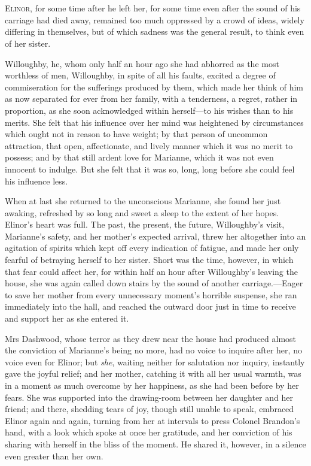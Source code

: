 \chapter[Chapter \thechapter]{}
\lettrine[lraise=0.3]{E}{linor}, for some time after he left her, for some time even after the sound of his carriage had died away, remained too much oppressed by a crowd of ideas, widely differing in themselves, but of which sadness was the general result, to think even of her sister.

Willoughby, he, whom only half an hour ago she had abhorred as the most worthless of men, Willoughby, in spite of all his faults, excited a degree of commiseration for the sufferings produced by them, which made her think of him as now separated for ever from her family, with a tenderness, a regret, rather in proportion, as she soon acknowledged within herself—to his wishes than to his merits. She felt that his influence over her mind was heightened by circumstances which ought not in reason to have weight; by that person of uncommon attraction, that open, affectionate, and lively manner which it was no merit to possess; and by that still ardent love for Marianne, which it was not even innocent to indulge. But she felt that it was so, long, long before she could feel his influence less.

When at last she returned to the unconscious Marianne, she found her just awaking, refreshed by so long and sweet a sleep to the extent of her hopes. Elinor's heart was full. The past, the present, the future, Willoughby's visit, Marianne's safety, and her mother's expected arrival, threw her altogether into an agitation of spirits which kept off every indication of fatigue, and made her only fearful of betraying herself to her sister. Short was the time, however, in which that fear could affect her, for within half an hour after Willoughby's leaving the house, she was again called down stairs by the sound of another carriage.—Eager to save her mother from every unnecessary moment's horrible suspense, she ran immediately into the hall, and reached the outward door just in time to receive and support her as she entered it.

Mrs Dashwood, whose terror as they drew near the house had produced almost the conviction of Marianne's being no more, had no voice to inquire after her, no voice even for Elinor; but \textit{she}, waiting neither for salutation nor inquiry, instantly gave the joyful relief; and her mother, catching it with all her usual warmth, was in a moment as much overcome by her happiness, as she had been before by her fears. She was supported into the drawing-room between her daughter and her friend; and there, shedding tears of joy, though still unable to speak, embraced Elinor again and again, turning from her at intervals to press Colonel Brandon's hand, with a look which spoke at once her gratitude, and her conviction of his sharing with herself in the bliss of the moment. He shared it, however, in a silence even greater than her own.

